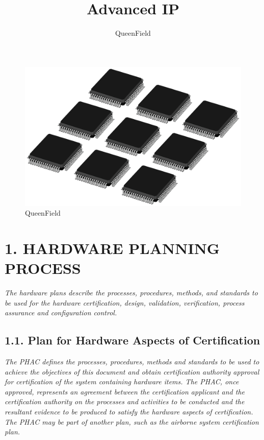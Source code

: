 \documentclass[]{article}
\title{Advanced IP}
\author{QueenField}
\date{}
\begin{document}
\maketitle

\begin{figure}
\centering
\includegraphics{../icon.jpg}
\caption{QueenField}
\end{figure}

\section{1. HARDWARE PLANNING PROCESS}\label{hardware-planning-process}

\emph{The hardware plans describe the processes, procedures, methods,
and standards to be used for the hardware certification, design,
validation, verification, process assurance and configuration control.}

\subsection{1.1. Plan for Hardware Aspects of
Certification}\label{plan-for-hardware-aspects-of-certification}

\emph{The PHAC defines the processes, procedures, methods and standards
to be used to achieve the objectives of this document and obtain
certification authority approval for certification of the system
containing hardware items. The PHAC, once approved, represents an
agreement between the certification applicant and the certification
authority on the processes and activities to be conducted and the
resultant evidence to be produced to satisfy the hardware aspects of
certification. The PHAC may be part of another plan, such as the
airborne system certification plan.}
\end{document}
